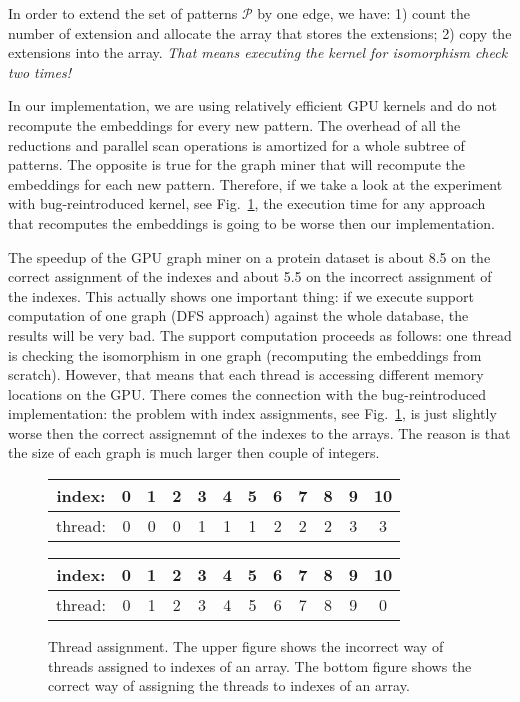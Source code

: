 \documentclass[a4paper,11pt]{article}
\def\patternset{\mathcal{P}}
\begin{document}
In order to extend the set of patterns $\patternset$ by one edge, we have:
1) count the number of extension and allocate the array that stores the extensions;
2) copy the extensions into the array.
\emph{That means executing the kernel for isomorphism check two times!}


In our implementation, we are using relatively efficient GPU kernels and do not recompute the embeddings for every new pattern.
The overhead of all the reductions and parallel scan operations is amortized for a whole subtree of patterns.
The opposite is true for the graph miner that will recompute the embeddings for each new pattern.
Therefore, if we take a look at the experiment with bug-reintroduced kernel, see Fig.~\ref{fig:bug-reintroduced}, the execution time for any approach that recomputes the embeddings is going to be worse then our implementation.

The speedup of the GPU graph miner on a protein dataset is about 8.5 on the correct assignment of the indexes and about 5.5 on the incorrect assignment of the indexes.
This actually shows one important thing: if we execute support computation of one graph (DFS approach) against the whole database, the results will be very bad.
The support computation proceeds as follows: one thread is checking the isomorphism in one graph (recomputing the embeddings from scratch).
However, that means that each thread is accessing different memory locations on the GPU.
There comes the connection with the bug-reintroduced implementation:
the problem with index assignments, see Fig.~\ref{fig:bug-reintroduced}, is just slightly worse then the correct assignemnt of the indexes to the arrays.
The reason is that the size of each graph is much larger then couple of integers.



\begin{figure}
\centering
\begin{tabular}{cccccccccccc}\hline
index:  & 0 & 1 & 2 & 3 & 4 & 5 & 6 & 7 & 8 & 9 & 10 \\ \hline
thread: & 0 & 0 & 0 & 1 & 1 & 1 & 2 & 2 & 2 & 3 &  3 \\ \hline
\end{tabular}

\bigskip
\begin{tabular}{cccccccccccc}\hline
index:  & 0 & 1 & 2 & 3 & 4 & 5 & 6 & 7 & 8 & 9 & 10 \\ \hline
thread: & 0 & 1 & 2 & 3 & 4 & 5 & 6 & 7 & 8 & 9 &  0 \\ \hline
\end{tabular}
\caption{Thread assignment. The upper figure shows the incorrect way
  of threads assigned to indexes of an array. The bottom figure shows
  the correct way of assigning the threads to indexes of an array.
}\label{fig:bug-reintroduced}
\end{figure}
\end{document}

